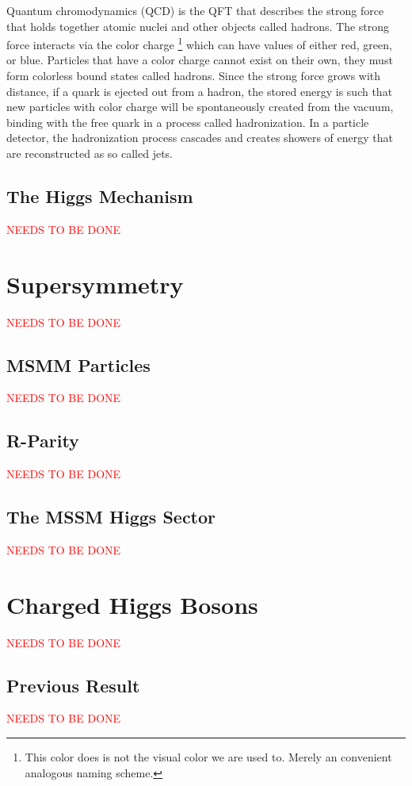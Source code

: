 		Quantum chromodynamics (QCD) is the QFT that describes the strong force that holds together atomic nuclei and other objects called hadrons. The strong force interacts via the color charge \footnote{This color does is not the visual color we are used to. Merely an convenient analogous naming scheme.} which can have values of either red, green, or blue. Particles that have a color charge cannot exist on their own, they must form colorless bound states called hadrons. Since the strong force grows with distance, if a quark is ejected out from a hadron, the stored energy is such that new particles with color charge will be spontaneously created from the vacuum, binding with the free quark in a process called hadronization. In a particle detector, the hadronization process cascades and creates showers of energy that are reconstructed as so called jets.

	\subsection{The Higgs Mechanism}\label{ssec:Higgs}
		\textcolor{red}{NEEDS TO BE DONE}

\section{Supersymmetry}\label{sec:SUSY}
	\textcolor{red}{NEEDS TO BE DONE}

	\subsection{MSMM Particles}\label{ssec:MSMM}
		\textcolor{red}{NEEDS TO BE DONE}

	\subsection{R-Parity}\label{ssec:R-Parity}
		\textcolor{red}{NEEDS TO BE DONE}

	\subsection{The MSSM Higgs Sector}\label{ssec:MSMM Higgs}
		\textcolor{red}{NEEDS TO BE DONE}

\section{Charged Higgs Bosons}\label{sec:HPlus}
	\textcolor{red}{NEEDS TO BE DONE}

	\subsection{Previous Result}\label{ssec:Prev HPlus}
		\textcolor{red}{NEEDS TO BE DONE}